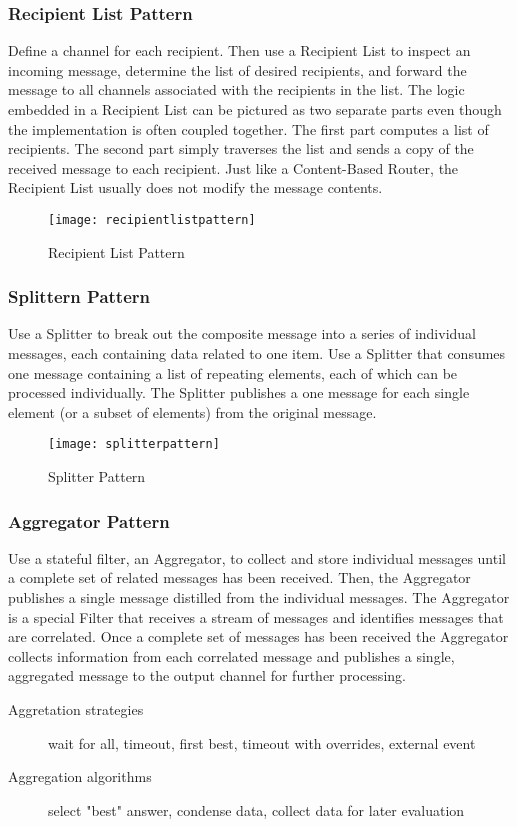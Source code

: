\subsubsection{Recipient List Pattern}
Define a channel for each recipient. Then use a Recipient List to inspect an incoming message, determine the list of desired recipients, and forward the message to all channels associated with the recipients in the list. The logic embedded in a Recipient List can be pictured as two separate parts even though the implementation is often coupled together. The first part computes a list of recipients. The second part simply traverses the list and sends a copy of the received message to each recipient. Just like a Content-Based Router, the Recipient List usually does not modify the message contents.

\begin{figure}[H]
  \center
  \texttt{[image: recipientlistpattern]}
  \caption{Recipient List Pattern}
\end{figure}

\subsubsection{Splittern Pattern}
Use a Splitter to break out the composite message into a series of individual messages, each containing data related to one item. Use a Splitter that consumes one message containing a list of repeating elements, each of which can be processed individually. The Splitter publishes a one message for each single element (or a subset of elements) from the original message.

\begin{figure}[H]
  \center
  \texttt{[image: splitterpattern]}
  \caption{Splitter Pattern}
\end{figure}

\subsubsection{Aggregator Pattern}
Use a stateful filter, an Aggregator, to collect and store individual messages until a complete set of related messages has been received. Then, the Aggregator publishes a single message distilled from the individual messages. The Aggregator is a special Filter that receives a stream of messages and identifies messages that are correlated. Once a complete set of messages has been received the Aggregator collects information from each correlated message and publishes a single, aggregated message to the output channel for further processing.
\begin{description}
  \item[Aggretation strategies] wait for all, timeout, first best, timeout with overrides, external event
  \item[Aggregation algorithms] select "best" answer, condense data, collect data for later evaluation
\end{description}

